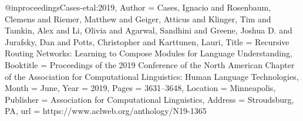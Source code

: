 @inproceedings{Cases-etal:2019,
  Author = {Cases, Ignacio  and  Rosenbaum, Clemens  and  Riemer, Matthew  and  Geiger, Atticus  and  Klinger, Tim  and  Tamkin, Alex  and  Li, Olivia  and  Agarwal, Sandhini  and  Greene, Joshua D.  and  Jurafsky, Dan  and  Potts, Christopher  and  Karttunen, Lauri},
  Title = {Recursive Routing Networks: Learning to Compose Modules for Language Understanding},
  Booktitle = {Proceedings of the 2019 Conference of the {N}orth {A}merican Chapter of the Association for Computational Linguistics: Human Language Technologies},
  Month = {June},
  Year = {2019},
  Pages = {3631--3648},
  Location = {Minneapolis},
  Publisher = {Association for Computational Linguistics},
  Address = {Stroudsburg, PA},
  url = {https://www.aclweb.org/anthology/N19-1365}}